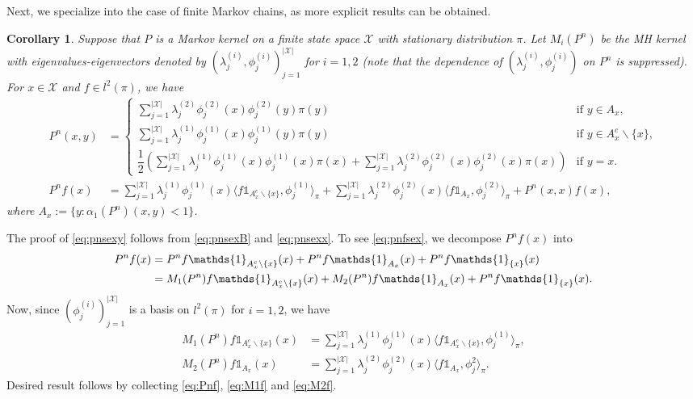\documentclass[12pt,a4]{amsart}
\numberwithin{equation}{section}
\theoremstyle{plain}
\newtheorem{corollary}{Corollary}[section]
\theoremstyle{definition}
\theoremstyle{remark}
\let\oldendproof\endproof
\renewenvironment{proof}[1][\proofname]{%
  \oldproof[\noindent\textbf{#1.} ]%
}{\oldendproof}
\newcommand{\1}{\mathds{1}}
\begin{document}
	Next, we specialize into the case of finite Markov chains, as more explicit results can be obtained.
	
	\begin{corollary}
		Suppose that $P$ is a Markov kernel on a finite state space $\mathcal{X}$ with stationary distribution $\pi$. Let $M_i(P^n)$ be the MH kernel with eigenvalues-eigenvectors denoted by $(\lambda^{(i)}_j,\phi^{(i)}_j)_{j=1}^{|\mathcal{X}|}$ for $i= 1,2$ (note that the dependence of $(\lambda^{(i)}_j,\phi^{(i)}_j)$ on $P^n$ is suppressed). For $x \in \mathcal{X}$ and $f \in l^2(\pi)$, we have
		\begin{align}
		 P^n(x,y) &= \begin{cases} \sum_{j = 1}^{|\mathcal{X}|} \lambda^{(2)}_j \phi^{(2)}_j(x) \phi^{(2)}_j(y) \pi(y) &\mbox{if } y \in A_x, \\
			\sum_{j = 1}^{|\mathcal{X}|} \lambda^{(1)}_j \phi^{(1)}_j(x) \phi^{(1)}_j(y)\pi(y) & \mbox{if } y \in A_x^c \backslash \{x\} , \\
			\dfrac{1}{2}(\sum_{j = 1}^{|\mathcal{X}|} \lambda^{(1)}_j \phi^{(1)}_j(x) \phi^{(1)}_j(x) \pi(x) + \sum_{j = 1}^{|\mathcal{X}|} \lambda^{(2)}_j \phi^{(2)}_j(x) \phi^{(2)}_j(x) \pi(x)) & \mbox{if } y = x. \end{cases} \label{eq:pnsexy}\\
		P^nf(x) &= \sum_{j = 1}^{|\mathcal{X}|} \lambda^{(1)}_j \phi^{(1)}_j(x) \langle f \1_{A_x^c \backslash \{x\}}, \phi^{(1)}_j \rangle_{\pi} + \sum_{j = 1}^{|\mathcal{X}|} \lambda^{(2)}_j \phi^{(2)}_j(x) \langle f \1_{A_x}, \phi^{(2)}_j \rangle_{\pi} + P^n(x,x) f(x) \label{eq:pnfsex},
		\end{align}
		where $A_x := \{y : \alpha_1(P^n)(x,y) < 1\} $.
	\end{corollary}
	
	\begin{proof}
		The proof of \eqref{eq:pnsexy} follows from \eqref{eq:pnsexB} and \eqref{eq:pnsexx}. To see \eqref{eq:pnfsex}, we decompose $P^nf(x)$ into
		\begin{align}
			P^nf(x) &= P^n f \1_{A_x^c \backslash \{x\}}(x) + P^n f \1_{A_x}(x) + P^n f \1_{\{x\}}(x) \notag \\
				    &= M_1(P^n) f \1_{A_x^c \backslash \{x\}}(x) + M_2(P^n) f \1_{A_x}(x) + P^n f \1_{\{x\}}(x) \label{eq:Pnf}.
		\end{align}
		Now, since $(\phi^{(i)}_j)_{j=1}^{|\mathcal{X}|}$ is a basis on $l^2(\pi)$ for $i = 1,2$, we have
		\begin{align}
			M_1(P^n) f \1_{A_x^c \backslash \{x\}}(x) &= \sum_{j = 1}^{|\mathcal{X}|} \lambda^{(1)}_j \phi^{(1)}_j(x) \langle f \1_{A_x^c \backslash \{x\}}, \phi^{(1)}_j \rangle_{\pi}, \label{eq:M1f} \\
			M_2(P^n) f \1_{A_x}(x) &= \sum_{j = 1}^{|\mathcal{X}|} \lambda^{(2)}_j \phi^{(2)}_j(x) \langle f \1_{A_x}, \phi^2_j \rangle_{\pi} . \label{eq:M2f}
		\end{align}
		Desired result follows by collecting \eqref{eq:Pnf}, \eqref{eq:M1f} and \eqref{eq:M2f}.
	\end{proof}
	
\end{document}
